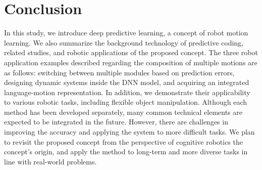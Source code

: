 
\section{Conclusion}

In this study, we introduce deep predictive learning, a concept of robot motion learning. We also summarize the background technology of predictive coding, related studies, and robotic applications of the proposed concept. The three robot application examples described regarding the composition of multiple motions are as follows: switching between multiple modules based on prediction errors, designing dynamic systems inside the DNN model, and acquiring an integrated language-motion representation. In addition, we demonstrate their applicability to various robotic tasks, including flexible object manipulation. Although each method has been developed separately, many common technical elements are expected to be integrated in the future. However, there are challenges in improving the accuracy and applying the system to more difficult tasks. We plan to revisit the proposed concept from the perspective of cognitive robotics the concept's origin, and apply the method to long-term and more diverse tasks in line with real-world problems.

